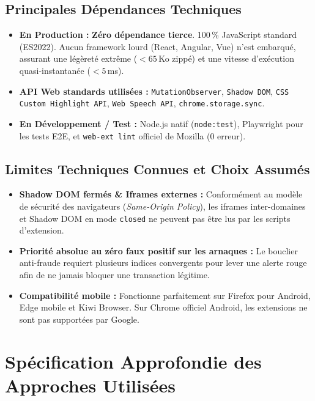 \documentclass[10pt,a4paper]{article}
\begin{document}
\subsection{Principales Dépendances Techniques}
\begin{itemize}
  \item \textbf{En Production :} \textbf{Zéro dépendance tierce}. 100\,\% JavaScript standard (ES2022). Aucun framework lourd (React, Angular, Vue) n'est embarqué, assurant une légèreté extrême ($< 65$\,Ko zippé) et une vitesse d'exécution quasi-instantanée ($< 5$\,ms).
  \item \textbf{API Web standards utilisées :} \texttt{MutationObserver}, \texttt{Shadow DOM}, \texttt{CSS Custom Highlight API}, \texttt{Web Speech API}, \texttt{chrome.storage.sync}.
  \item \textbf{En Développement / Test :} Node.js natif (\texttt{node:test}), Playwright pour les tests E2E, et \texttt{web-ext lint} officiel de Mozilla (0 erreur).
\end{itemize}

\subsection{Limites Techniques Connues et Choix Assumés}
\begin{itemize}
  \item \textbf{Shadow DOM fermés \& Iframes externes :} Conformément au modèle de sécurité des navigateurs (\textit{Same-Origin Policy}), les iframes inter-domaines et Shadow DOM en mode \texttt{closed} ne peuvent pas être lus par les scripts d'extension.
  \item \textbf{Priorité absolue au zéro faux positif sur les arnaques :} Le bouclier anti-fraude requiert plusieurs indices convergents pour lever une alerte rouge afin de ne jamais bloquer une transaction légitime.
  \item \textbf{Compatibilité mobile :} Fonctionne parfaitement sur Firefox pour Android, Edge mobile et Kiwi Browser. Sur Chrome officiel Android, les extensions ne sont pas supportées par Google.
\end{itemize}

\newpage

\section{Spécification Approfondie des Approches Utilisées}
\end{document}
